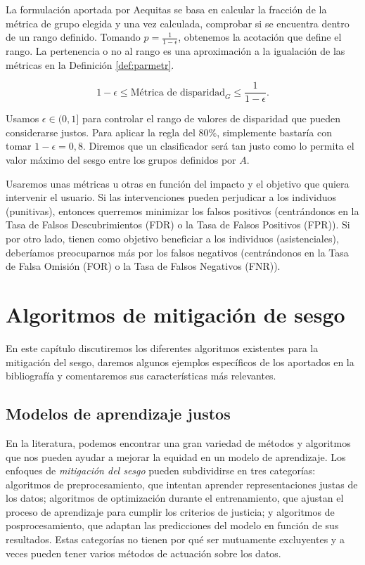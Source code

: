 \documentclass[oneside,openright,titlepage,numbers=noenddot,openany,headinclude,footinclude=true,
cleardoublepage=empty,abstractoff,BCOR=5mm,paper=a4,fontsize=12pt,main=spanish]{scrreprt}
\begin{document}
La formulación aportada por Aequitas se basa en calcular la fracción de la métrica de grupo elegida y una vez calculada, comprobar si se encuentra dentro de un rango definido. Tomando $p=\frac{1}{1-\epsilon}$, obtenemos la acotación que define el rango. La pertenencia o no al rango es una aproximación a la igualación de las métricas en la Definición \ref{def:parmetr}.

\begin{equation}
1-\epsilon \leq \text{Métrica de disparidad}_{G} \leq \frac{1}{1-\epsilon}.
\end{equation}

Usamos $\epsilon \in
(0,1]$ para controlar el rango de valores de disparidad que pueden considerarse justos. Para aplicar la regla del 80\%, simplemente bastaría con tomar $1-\epsilon=0,8$. Diremos que un clasificador será tan justo como lo permita el valor máximo del sesgo entre los grupos definidos por $A$. 

Usaremos unas métricas u otras en función del impacto y el objetivo que quiera intervenir el usuario. Si las intervenciones pueden perjudicar a los individuos (punitivas), entonces querremos minimizar los falsos positivos (centrándonos en la Tasa de Falsos Descubrimientos (FDR) o la Tasa de Falsos Positivos (FPR)). Si por otro lado, tienen como objetivo beneficiar a los individuos (asistenciales), deberíamos preocuparnos más por los falsos negativos (centrándonos en la Tasa de Falsa Omisión (FOR) o la Tasa de Falsos Negativos (FNR)).

\chapter{Algoritmos de mitigación de sesgo}

En este capítulo discutiremos los diferentes algoritmos existentes para la mitigación del sesgo, daremos algunos ejemplos específicos de los aportados en la bibliografía y comentaremos sus características más relevantes.

\section{Modelos de aprendizaje justos}

En la literatura, podemos encontrar una gran variedad de métodos y algoritmos que nos pueden ayudar a mejorar la equidad en un modelo de aprendizaje. Los enfoques de \textit{mitigación del sesgo} pueden subdividirse en tres categorías: algoritmos de preprocesamiento, que intentan aprender representaciones justas de los datos; algoritmos de optimización durante el entrenamiento, que ajustan el proceso de aprendizaje para cumplir los criterios de justicia; y algoritmos de posprocesamiento, que adaptan las predicciones del modelo en función de sus resultados. Estas categorías no tienen por qué ser mutuamente excluyentes y a veces pueden tener varios métodos de actuación sobre los datos.
\end{document}
